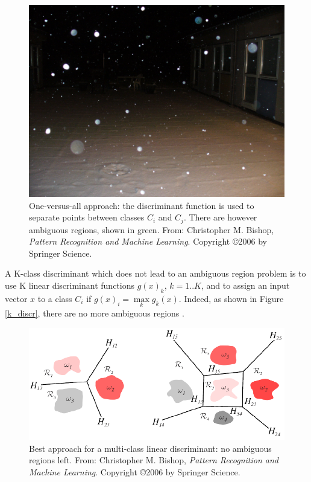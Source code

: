 \begin{figure}[!h]
\begin{center}
\noindent \includegraphics[scale=0.1]{figures/one_vs_all} 
\newline
\caption{One-versus-all approach: the discriminant function is used to separate points between classes $C_i$ and $C_j$. There are however ambiguous regions, shown in green. From: Christopher M. Bishop, \textit{Pattern Recognition and Machine Learning}. Copyright \copyright  2006 by Springer Science.}
\label{one_vs_all}
\end{center} 
\end{figure}

\noindent A K-class discriminant which does not lead to an ambiguous region problem is to use K linear discriminant functions $g(x)_k$, $k=1..K$, and to assign an input vector $x$ to a class $C_i$ if $g(x)_i = \max\limits_{k} g_k(x)$. Indeed, as shown in Figure \ref{k_discr}, there are no more ambiguous regions \cite{BIS06}.
\newline

\begin{figure}[!h]
\begin{center}
\noindent \includegraphics[scale=0.1]{figures/lda_k_disc} 
\newline
\caption{Best approach for a multi-class linear discriminant: no ambiguous regions left. From: Christopher M. Bishop, \textit{Pattern Recognition and Machine Learning}. Copyright \copyright  2006 by Springer Science.}
\label{k_disc}
\end{center} 
\end{figure}

